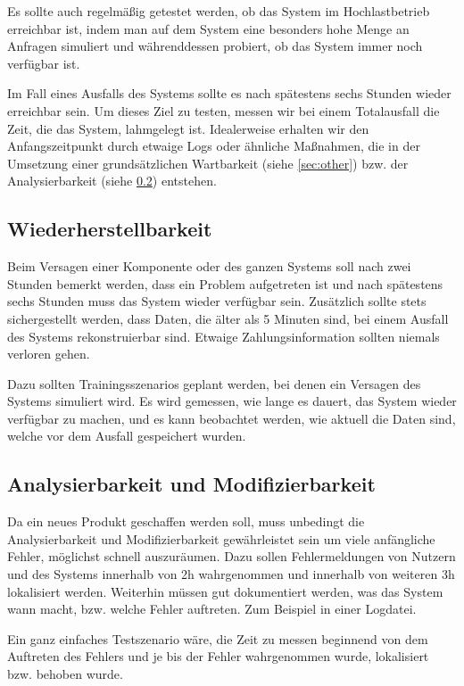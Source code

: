 Es sollte auch regelmäßig getestet werden, ob das System im Hochlastbetrieb erreichbar ist,
indem man auf dem System eine besonders hohe Menge an Anfragen simuliert und währenddessen probiert,
ob das System immer noch verfügbar ist.

Im Fall eines Ausfalls des Systems sollte es nach spätestens sechs Stunden wieder erreichbar sein. Um dieses Ziel zu testen, messen wir bei einem Totalausfall die Zeit, die das System, lahmgelegt ist. Idealerweise erhalten wir den Anfangszeitpunkt durch etwaige Logs oder ähnliche Maßnahmen, die in der Umsetzung einer grundsätzlichen Wartbarkeit (siehe \ref{sec:other}) bzw. der Analysierbarkeit (siehe \ref{sec:anal}) entstehen.

\subsection{Wiederherstellbarkeit}
Beim Versagen einer Komponente oder des ganzen Systems soll nach zwei Stunden bemerkt werden,
dass ein Problem aufgetreten ist und nach spätestens sechs Stunden muss das System wieder verfügbar sein.
Zusätzlich sollte stets sichergestellt werden, dass Daten, die älter als 5 Minuten sind, bei einem Ausfall des Systems rekonstruierbar sind. Etwaige Zahlungsinformation sollten niemals verloren gehen.

Dazu sollten Trainingsszenarios geplant werden, bei denen ein Versagen des Systems simuliert wird.
Es wird gemessen, wie lange es dauert, das System wieder verfügbar zu machen, und es kann beobachtet werden,
wie aktuell die Daten sind, welche vor dem Ausfall gespeichert wurden.


\subsection{Analysierbarkeit und Modifizierbarkeit} \label{sec:anal}
Da ein neues Produkt geschaffen werden soll, muss unbedingt die Analysierbarkeit und Modifizierbarkeit gewährleistet sein um viele anfängliche Fehler, möglichst schnell auszuräumen.
Dazu sollen Fehlermeldungen von Nutzern und des Systems innerhalb von 2h wahrgenommen und innerhalb von weiteren 3h lokalisiert werden.
Weiterhin müssen gut dokumentiert werden, was das System wann macht, bzw. welche Fehler auftreten. Zum Beispiel in einer Logdatei.

Ein ganz einfaches Testszenario wäre, die Zeit zu messen beginnend von dem Auftreten des Fehlers und je bis der Fehler wahrgenommen wurde, lokalisiert bzw. behoben wurde.

